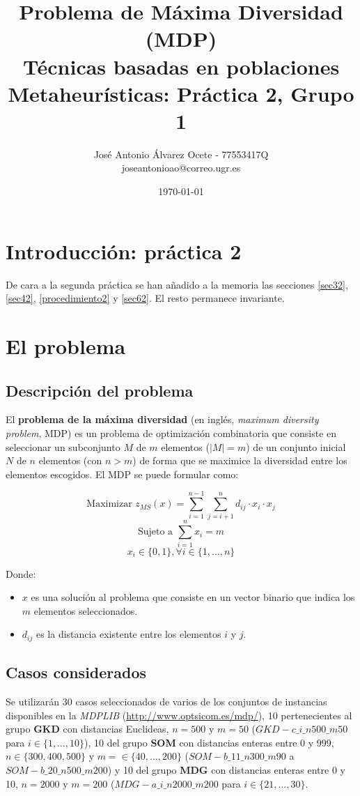 \documentclass[11pt,a4paper]{article}
\title{Problema de Máxima Diversidad (MDP) 
	\\\medskip \large Técnicas basadas en poblaciones \\\medskip
	\large Metaheurísticas: Práctica 2, Grupo 1}
\author{José Antonio Álvarez Ocete - 77553417Q \\ joseantonioao@correo.ugr.es}
\date{ \today }
\begin{document}
	
	
	\maketitle 
	\newpage
	\tableofcontents
	\newpage
	
	\section{Introducción: práctica 2}
	
	De cara a la segunda práctica se han añadido a la memoria las secciones \ref{sec32}, \ref{sec42}, \ref{procedimiento2} y  \ref{sec62}. El resto permanece invariante.
	
	\section{El problema}
	
	\subsection{Descripción del problema}
	
	El \textbf{problema de la máxima diversidad} (en inglés, \emph{maximum diversity problem}, MDP) es un problema de optimización combinatoria que consiste en seleccionar un
	subconjunto $M$ de $m$ elementos ($|M|=m$) de un conjunto inicial $N$ de $n$ elementos (con $n>m$) de forma que se maximice la diversidad entre los elementos escogidos. El MDP se puede formular como:
	
	$$ \text{Maximizar } z_{MS}(x) = \sum_{i=1}^{n-1} \sum_{j=i+1}^{n} d_{ij} \cdot x_i \cdot x_j $$
	$$ \text{Sujeto a } \sum_{i=1}^{n} x_i = m $$
	$$ x_i \in \{0,1\}, \forall i \in \{1,\dotsc,n\} $$
	
	Donde:
	\begin{itemize}
		\item $x$ es una solución al problema que consiste en un vector binario que indica los $m$ elementos seleccionados.
		\item $d_{ij}$ es la distancia existente entre los elementos $i$ y $j$.
		
	\end{itemize}

	\subsection{Casos considerados}
	
	Se utilizarán 30 casos seleccionados de varios de los conjuntos de instancias disponibles en la \emph{MDPLIB} (\url{http://www.optsicom.es/mdp/}), 10 pertenecientes al grupo \textbf{GKD} con distancias Euclideas, $n=500$ y $m=50$ ($GKD-c\_i\_n500\_m50$ para $i\in\{1,\dotsc,10\}$), 10 del grupo \textbf{SOM} con distancias enteras entre 0 y 999, $n\in\{300,400,500\}$ y $m=\in\{40,\dotsc,200\}$ ($SOM-b\_11\_n300\_m90$ a $SOM-b\_20\_n500\_m200$) y 10 del grupo \textbf{MDG} con distancias enteras entre 0 y 10, $n=2000$ y $m=200$ ($MDG-a\_i\_n2000\_m200$ para $i\in\{21,\dotsc,30\}$. \\
	
\end{document}
